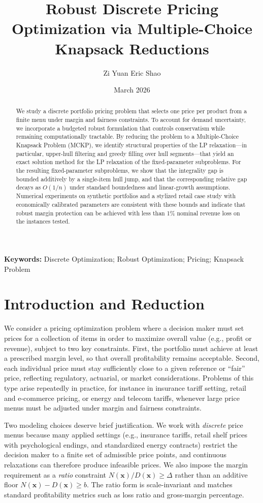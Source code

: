 \documentclass[11pt, a4paper]{article}
\title{Robust Discrete Pricing Optimization via Multiple-Choice Knapsack Reductions}
\author[1]{Zi Yuan Eric Shao}
\affil[1]{Department of Mathematics, ETH Zürich, \texttt{ershao@student.ethz.ch}}
\date{March 2026}
\makeatletter
\renewcommand{\maketitle}{
    \begin{center}
        {\LARGE \bfseries \@title \par}
        \vspace{1.0em}
        {\large \@author \par}
        \vspace{0.5em}
        {\itshape \@date}
    \end{center}
    \vspace{1.0em}
}
\theoremstyle{plain}
\theoremstyle{definition}
\theoremstyle{remark}
\newcommand{\keywords}[1]{\vspace{1em}\noindent\textbf{Keywords:} #1}
\makeatother
\begin{document}
\maketitle

\begin{abstract}
We study a discrete portfolio pricing problem that selects one price per product from a finite menu under margin and fairness constraints. To account for demand uncertainty, we incorporate a budgeted robust formulation that controls conservatism while remaining computationally tractable. By reducing the problem to a Multiple-Choice Knapsack Problem (MCKP), we identify structural properties of the LP relaxation---in particular, upper-hull filtering and greedy filling over hull segments---that yield an exact solution method for the LP relaxation of the fixed-parameter subproblems. For the resulting fixed-parameter subproblems, we show that the integrality gap is bounded additively by a single-item hull jump, and that the corresponding relative gap decays as \(O(1/n)\) under standard boundedness and linear-growth assumptions. Numerical experiments on synthetic portfolios and a stylized retail case study with economically calibrated parameters are consistent with these bounds and indicate that robust margin protection can be achieved with less than 1\% nominal revenue loss on the instances tested.
\end{abstract}

\keywords{Discrete Optimization; Robust Optimization; Pricing; Knapsack Problem}

\section{Introduction and Reduction}\label{sec:intro}
We consider a pricing optimization problem where a decision maker must set prices for a collection of items in order to maximize overall value (e.g., profit or revenue), subject to two key constraints. First, the portfolio must achieve at least a prescribed margin level, so that overall profitability remains acceptable. Second, each individual price must stay sufficiently close to a given reference or ``fair'' price, reflecting regulatory, actuarial, or market considerations. Problems of this type arise repeatedly in practice, for instance in insurance tariff setting, retail and e-commerce pricing, or energy and telecom tariffs, whenever large price menus must be adjusted under margin and fairness constraints.

Two modeling choices deserve brief justification. We work with \emph{discrete} price menus because many applied settings (e.g., insurance tariffs, retail shelf prices with psychological endings, and standardized energy contracts) restrict the decision maker to a finite set of admissible price points, and continuous relaxations can therefore produce infeasible prices. We also impose the margin requirement as a \emph{ratio} constraint $N(\bm{x})/D(\bm{x}) \geq \Delta$ rather than an additive floor $N(\bm{x}) - D(\bm{x}) \geq b$. The ratio form is scale-invariant and matches standard profitability metrics such as loss ratio and gross-margin percentage.
\end{document}
